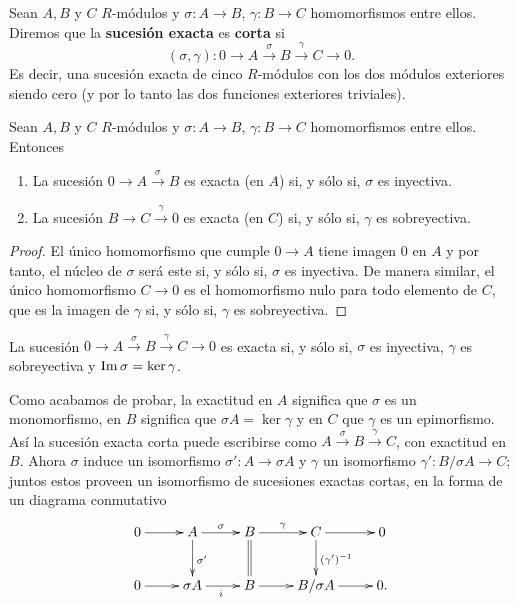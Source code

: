 \begin{definicion}
	Sean \(A,B\) y \(C\) \(R\)-módulos y \(\sigma: A \rightarrow B\),
	\(\gamma: B \rightarrow C\) homomorfismos entre ellos. Diremos que la \textbf{sucesión
		exacta} es \textbf{corta} si
	\[
	(\sigma, \gamma): 0 \rightarrow A \xrightarrow{\sigma}B \xrightarrow{\gamma}C
	\rightarrow 0.
	\]
	Es decir, una sucesión exacta de cinco \(R\)-módulos con los dos módulos
	exteriores siendo cero (y por lo tanto las dos funciones exteriores triviales).
\end{definicion}

\begin{proposicion}
	Sean \(A,B\) y \(C\) \(R\)-módulos y \(\sigma: A \rightarrow B\),
	\(\gamma: B \rightarrow C\) homomorfismos entre ellos. Entonces
	\begin{enumerate}
		\item La sucesión \(0 \to A \overset{\sigma}{\to}B\) es exacta (en \(A\)) si, y
		sólo si, \(\sigma\) es inyectiva.
		
		\item La sucesión \(B \to C \overset{\gamma}{\to}0\) es exacta (en \(C\)) si, y
		sólo si, \(\gamma\) es sobreyectiva.
	\end{enumerate}
\end{proposicion}
\begin{proof}
	El único homomorfismo que cumple \(0 \to A\) tiene imagen \(0\) en \(A\) y por tanto,
	el núcleo de \(\sigma\) será este si, y sólo si, \(\sigma\) es inyectiva. De manera
	similar, el único homomorfismo \(C \to 0\) es el homomorfismo nulo para todo
	elemento de \(C\), que es la imagen de \(\gamma\) si, y sólo si, \(\gamma\) es sobreyectiva.
\end{proof}
\begin{corolario}
	La sucesión \(0 \rightarrow A \xrightarrow{\sigma}B \xrightarrow{\gamma}C \rightarrow
	0\) es exacta si, y sólo si, \(\sigma\) es inyectiva, \(\gamma\) es sobreyectiva y
	\(\operatorname{Im} \sigma = \ker \gamma\).
\end{corolario}

Como acabamos de probar, la exactitud en \(A\) significa que \(\sigma\) es un monomorfismo,
en \(B\) significa que \(\sigma A = \ker \gamma\) y en \(C\) que \(\gamma\) es un
epimorfismo. Así la sucesión exacta corta puede escribirse como \(A \xrightarrow{\sigma}
B \xrightarrow{\gamma}C\), con exactitud en \(B\). Ahora \(\sigma\) induce un isomorfismo
\(\sigma': A \to \sigma A\) y \(\gamma\) un isomorfismo \(\gamma': B/\sigma A \to C\);
juntos estos proveen un isomorfismo de sucesiones exactas cortas, en la forma de
un diagrama conmutativo
\begin{equation}
	\label{exactshortseq-equiv}\xymatrix{ 0 \ar[r] & A \ar[r]^{\sigma} \ar[d]^{\sigma'} & B \ar[r]^\gamma \ar@{=}[d] & C \ar[r] \ar[d]^{(\gamma')^{-1}} & 0 \\ 0 \ar[r] & \sigma A \ar[r]_i & B \ar[r] & B/\sigma A \ar[r] & 0. }
\end{equation}

